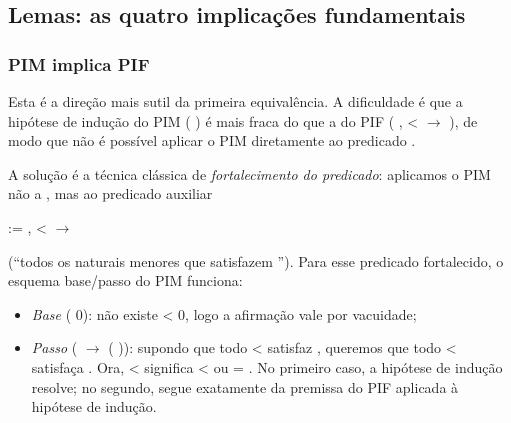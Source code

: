 \subsection{Lemas: as quatro implicações fundamentais}




\subsubsection{PIM implica PIF}




    Esta é a direção mais sutil da primeira equivalência. A
    dificuldade é que a hipótese de indução do PIM ( ) é mais
    fraca do que a do PIF (\coqdockw{\ensuremath{\forall}} ,  <  \ensuremath{\rightarrow}  ), de modo que
    não é possível aplicar o PIM diretamente ao predicado .


    A solução é a técnica clássica de \textit{fortalecimento do predicado}:
    aplicamos o PIM não a , mas ao predicado auxiliar


      := \coqdockw{\ensuremath{\forall}} ,  <  \ensuremath{\rightarrow}  


    (``todos os naturais menores que  satisfazem ''). Para esse
    predicado fortalecido, o esquema base/passo do PIM funciona:



\begin{itemize}
\item  \textit{Base} ( 0): não existe  < 0, logo a afirmação vale por
      vacuidade;



\item  \textit{Passo} (  \ensuremath{\rightarrow}  ( )): supondo que todo  <  satisfaz
      , queremos que todo  <   satisfaça . Ora,  <  
      significa  <  ou  = . No primeiro caso, a hipótese de
      indução resolve; no segundo,   segue exatamente da premissa
      do PIF aplicada à hipótese de indução.

\end{itemize}



